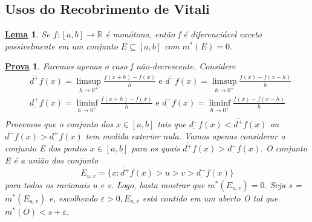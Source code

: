 \documentclass{article}
\newtheorem*{lemma*}{\underline{Lema}}
\newtheorem*{proof*}{\underline{Prova}}
\begin{document}
\subsection{Usos do Recobrimento de Vitali}
\begin{lemma*}
  Se \(f:[a, b]\rightarrow \mathbb{R}\) é monótona, então f é diferenciável exceto 
  possivelmente em um conjunto \(E\subseteq{[a, b]}\) com \(m^{*}(E) = 0\).
\end{lemma*}
\begin{proof*}
  Faremos apenas o caso f não-decrescente. Considere 
 \begin{align*}
   &\overline{d^{+}}f(x) = \limsup_{h\to 0^{+}} \frac{f(x+h)-f(x)}{h}\text{ e }\overline{d^{-}}f(x) = \limsup_{h\to 0^{+}}\frac{f(x) - f(x-h)}{h}\\
   &\underline{d^{+}}f(x) = \liminf_{h\to 0^{+}} \frac{f(x+h)-f(x)}{h}\text{ e }\underline{d^{-}}f(x) = \liminf_{h\to 0^{+}}\frac{f(x) - f(x-h)}{h}\\
 \end{align*}
 Provemos que o conjunto dos \(x\in[a, b]\) tais que \(\underline{d^{-}}f(x) < \overline{d^{+}}f(x)\) 
 ou \(\overline{d^{-}}f(x) > \underline{d^{+}}f(x)\) tem medida exterior nula.
 Vamos apenas considerar o conjunto E dos pontos \(x\in[a, b]\) para os quais
 \(\overline{d^{+}}f(x) > \underline{d^{-}}f(x).\) O conjunto E é a união
 dos conjunto 
   \[
   E_{u, v} = \{x: \overline{d^{+}}f(x) > u > v > \underline{d^{-}}f(x) \}
   \]
 para todos os racionais u e v. Logo, basta mostrar que \(m^{*}(E_{u, v}) = 0.\)
Seja s = \(m^{*}(E_{u,v })\) e, escolhendo \(\varepsilon >0, E_{u, v}\) está contido
em um aberto O tal que \(m^{*}(O) < s + \varepsilon .\)


\end{proof*}
\end{document}
